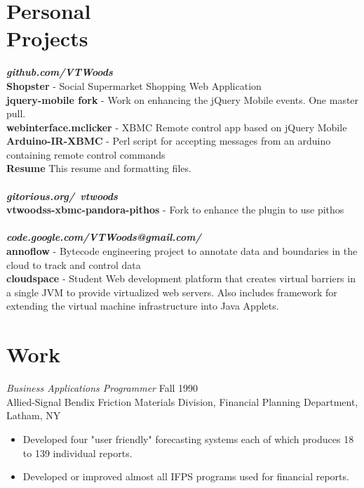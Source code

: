 \documentclass[line,margin]{res}
\begin{document}
\begin{resume}
\section{Personal \\ Projects}  \textbf{\emph{github.com/VTWoods}} \\
\textbf{Shopster} - Social Supermarket Shopping Web Application \\
\textbf{jquery-mobile fork} - Work on enhancing the jQuery Mobile events. One master pull. \\
\textbf{webinterface.mclicker} - XBMC Remote control app based on jQuery Mobile \\
\textbf{Arduino-IR-XBMC} - Perl script for accepting messages from an arduino containing remote control commands \\
\textbf{Resume} This resume and formatting files. \\
\\[-5pt]
\textbf{\emph{gitorious.org/~vtwoods}} \\
\textbf{vtwoodss-xbmc-pandora-pithos} - Fork to enhance the plugin to use pithos \\
\\[-5pt]
\textbf{\emph{code.google.com/VTWoods@gmail.com/}} \\
\textbf{annoflow} - Bytecode engineering project to annotate data and boundaries in the cloud to track and control data \\
\textbf{cloudspace} - Student Web development platform that creates virtual barriers in a single JVM to provide virtualized web servers.  Also includes framework for extending the virtual machine infrastructure into Java Applets.


\section{Work} {\sl Business Applications Programmer} \hfill Fall 1990 \\
                Allied-Signal Bendix Friction Materials Division, 
                Financial Planning Department, Latham, NY
                 \begin{itemize}  \itemsep -2pt %
                 \item Developed four "user friendly" forecasting 
                    systems each of which produces 18 to 139 
                    individual reports. 
                \item   Developed or improved almost all IFPS 
                    programs used for financial reports. 
                \end{itemize}
 

\end{resume}
\end{document}
